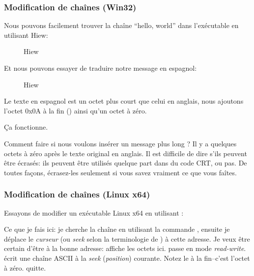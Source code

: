 ﻿\subsubsection{Modification de chaînes (Win32)}

Nous pouvons facilement trouver la chaîne ``hello, world'' dans l'exécutable en utilisant Hiew:

\begin{figure}[H]
\centering
{}
\caption{Hiew}
\label{}
\end{figure}

Et nous pouvons essayer de traduire notre message en espagnol:

\begin{figure}[H]
\centering
{}
\caption{Hiew}
\label{}
\end{figure}

Le texte en espagnol est un octet plus court que celui en anglais, nous ajoutons l'octet 0x0A à la fin
 () ainsi qu'un octet à zéro.

Ça fonctionne.

Comment faire si nous voulons insérer un message plus long ?
Il y a quelques octets à zéro après le texte original en anglais.
Il est difficile de dire s’ils peuvent être écrasés: ils peuvent être utilisés quelque part dans du code \ac{CRT},
ou pas.
De toutes façons, écrasez-les seulement si vous savez vraiment ce que vous faîtes.

\subsubsection{Modification de chaînes (Linux x64)}

\myindex{\radare}
Essayons de modifier un exécutable Linux x64 en utilisant \radare{}:



Ce que je fais ici: je cherche la chaîne  en utilisant la commande  \TT{/},
ensuite je déplace le \emph{curseur} (ou \emph{seek} selon la terminologie de \radare{}) à cette adresse.
Je veux être certain d'être à la bonne adresse:  affiche les octets ici.
 passe \radare{} en mode \emph{read-write}.
 écrit une chaîne ASCII à la \emph{seek} (\emph{position}) courante.
Notez le  à la fin--c'est l'octet à zéro.
 quitte.

